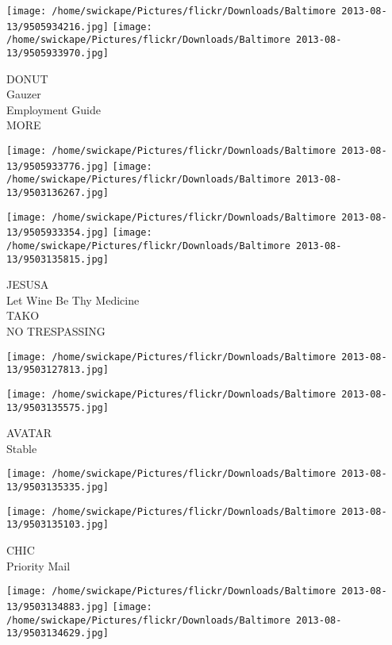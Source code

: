 \documentclass[10pt,letterpaper]{article}
\begin{document}
\texttt{[image: /home/swickape/Pictures/flickr/Downloads/Baltimore 2013-08-13/9505934216.jpg]}
\texttt{[image: /home/swickape/Pictures/flickr/Downloads/Baltimore 2013-08-13/9505933970.jpg]}

DONUT\\
Gauzer\\
Employment Guide\\
MORE\\
\pagebreak

\texttt{[image: /home/swickape/Pictures/flickr/Downloads/Baltimore 2013-08-13/9505933776.jpg]}
\texttt{[image: /home/swickape/Pictures/flickr/Downloads/Baltimore 2013-08-13/9503136267.jpg]}

\texttt{[image: /home/swickape/Pictures/flickr/Downloads/Baltimore 2013-08-13/9505933354.jpg]}
\texttt{[image: /home/swickape/Pictures/flickr/Downloads/Baltimore 2013-08-13/9503135815.jpg]}

JESUSA\\
Let Wine Be Thy Medicine\\
TAKO\\
NO TRESPASSING\\
\pagebreak

\texttt{[image: /home/swickape/Pictures/flickr/Downloads/Baltimore 2013-08-13/9503127813.jpg]}

\vspace{0.25in}
\texttt{[image: /home/swickape/Pictures/flickr/Downloads/Baltimore 2013-08-13/9503135575.jpg]}

AVATAR\\
Stable\\
\pagebreak

\texttt{[image: /home/swickape/Pictures/flickr/Downloads/Baltimore 2013-08-13/9503135335.jpg]}

\vspace{0.25in}
\texttt{[image: /home/swickape/Pictures/flickr/Downloads/Baltimore 2013-08-13/9503135103.jpg]}

CHIC\\
Priority Mail\\
\pagebreak

\texttt{[image: /home/swickape/Pictures/flickr/Downloads/Baltimore 2013-08-13/9503134883.jpg]}
\texttt{[image: /home/swickape/Pictures/flickr/Downloads/Baltimore 2013-08-13/9503134629.jpg]}
\end{document}
